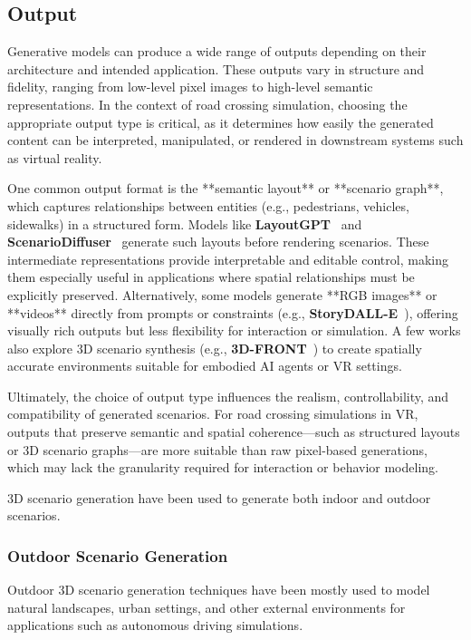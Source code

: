 \documentclass{article}
\begin{document}
\begin{table}[ht]
\subsection{Output}

Generative models can produce a wide range of outputs depending on their architecture and intended application. These outputs vary in structure and fidelity, ranging from low-level pixel images to high-level semantic representations. In the context of road crossing simulation, choosing the appropriate output type is critical, as it determines how easily the generated content can be interpreted, manipulated, or rendered in downstream systems such as virtual reality.

One common output format is the **semantic layout** or **scenario graph**, which captures relationships between entities (e.g., pedestrians, vehicles, sidewalks) in a structured form. Models like \textbf{LayoutGPT}~\cite{feng2023layoutgpt} and \textbf{ScenarioDiffuser}~\cite{yang2023scenariodiffuser} generate such layouts before rendering scenarios. These intermediate representations provide interpretable and editable control, making them especially useful in applications where spatial relationships must be explicitly preserved. Alternatively, some models generate **RGB images** or **videos** directly from prompts or constraints (e.g., \textbf{StoryDALL-E}~\cite{storydalle}), offering visually rich outputs but less flexibility for interaction or simulation. A few works also explore 3D scenario synthesis (e.g., \textbf{3D-FRONT}~\cite{fu20213dfront}) to create spatially accurate environments suitable for embodied AI agents or VR settings.

Ultimately, the choice of output type influences the realism, controllability, and compatibility of generated scenarios. For road crossing simulations in VR, outputs that preserve semantic and spatial coherence—such as structured layouts or 3D scenario graphs—are more suitable than raw pixel-based generations, which may lack the granularity required for interaction or behavior modeling.


3D scenario generation have been used to generate both indoor and outdoor scenarios.


\subsubsection{Outdoor Scenario Generation}

Outdoor 3D scenario generation techniques have been mostly used to model natural landscapes, urban settings, and other external environments for applications such as autonomous driving simulations.


\end{table}
\end{document}
